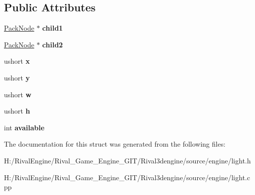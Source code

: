 \subsection*{Public Attributes}
\begin{DoxyCompactItemize}
\item 
\mbox{\label{struct_pack_node_a1d4bc695745865803548ddc01ee44167}} 
\hyperlink{struct_pack_node}{Pack\+Node} $\ast$ {\bfseries child1}
\item 
\mbox{\label{struct_pack_node_a2f68474d2fd111cdc043c5ff1f7e383b}} 
\hyperlink{struct_pack_node}{Pack\+Node} $\ast$ {\bfseries child2}
\item 
\mbox{\label{struct_pack_node_ab8bca4996bd000d99b4aade2298ce243}} 
ushort {\bfseries x}
\item 
\mbox{\label{struct_pack_node_acc6208b78dcc9aed5e9a3be8d21b0e11}} 
ushort {\bfseries y}
\item 
\mbox{\label{struct_pack_node_af63f2e7695e5c50f72ff9f0cf1784451}} 
ushort {\bfseries w}
\item 
\mbox{\label{struct_pack_node_a16710d1971a8fdee0f964314874efe93}} 
ushort {\bfseries h}
\item 
\mbox{\label{struct_pack_node_aec77c9047cb0d0a9420d93ff7b974ccb}} 
int {\bfseries available}
\end{DoxyCompactItemize}


The documentation for this struct was generated from the following files\+:\begin{DoxyCompactItemize}
\item 
H\+:/\+Rival\+Engine/\+Rival\+\_\+\+Game\+\_\+\+Engine\+\_\+\+G\+I\+T/\+Rival3dengine/source/engine/light.\+h\item 
H\+:/\+Rival\+Engine/\+Rival\+\_\+\+Game\+\_\+\+Engine\+\_\+\+G\+I\+T/\+Rival3dengine/source/engine/light.\+cpp\end{DoxyCompactItemize}
